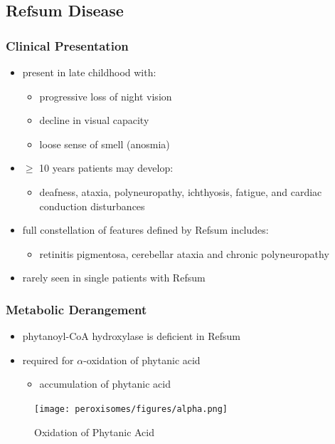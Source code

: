 \documentclass[12pt]{scrartcl}
\begin{document}
\subsection{Refsum Disease}
\label{sec:org730d62c}
\subsubsection{Clinical Presentation}
\label{sec:orga9f0fdf}
\begin{itemize}
\item present in late childhood with:
\begin{itemize}
\item progressive loss of night vision
\item decline in visual capacity
\item loose sense of smell (anosmia)
\end{itemize}
\item \(\ge\) 10 years patients may develop:
\begin{itemize}
\item deafness, ataxia, polyneuropathy, ichthyosis, fatigue, and cardiac
conduction disturbances
\end{itemize}
\item full constellation of features defined by Refsum includes:
\begin{itemize}
\item retinitis pigmentosa, cerebellar ataxia and chronic polyneuropathy
\end{itemize}
\item rarely seen in single patients with Refsum
\end{itemize}

\subsubsection{Metabolic Derangement}
\label{sec:orge24bf7c}
\begin{itemize}
\item phytanoyl-CoA hydroxylase is deficient in Refsum
\item required for \(\alpha\)-oxidation of phytanic acid
\begin{itemize}
\item accumulation of phytanic acid
\end{itemize}
\end{itemize}

\begin{figure}[htbp]
\centering
\texttt{[image: peroxisomes/figures/alpha.png]}
\caption[oxidation of phytanic]{\label{fig:org8ac41da}Oxidation of Phytanic Acid}
\end{figure}
\end{document}
